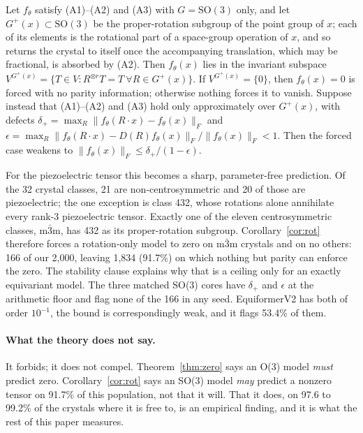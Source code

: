 \begin{corollary}\label{cor:rot}
Let $f_\theta$ satisfy (A1)--(A2) and (A3) with $G=\mathrm{SO}(3)$ only, and let $G^{+}(x)\subset\mathrm{SO}(3)$ be the proper-rotation subgroup of the point group of $x$; each of its elements is the rotational part of a space-group operation of $x$, and so returns the crystal to itself once the accompanying translation, which may be fractional, is absorbed by (A2). Then $f_\theta(x)$ lies in the invariant subspace $V^{G^{+}(x)} = \{T \in V : R^{\otimes r}T = T\ \forall R \in G^{+}(x)\}$. If $V^{G^{+}(x)} = \{0\}$, then $f_\theta(x)=0$ is forced with no parity information; otherwise nothing forces it to vanish. Suppose instead that (A1)--(A2) and (A3) hold only approximately over $G^{+}(x)$, with defects
$\delta_{+} = \max_{R} \lVert f_\theta(R\!\cdot\!x) - f_\theta(x)\rVert_F$ and
$\epsilon = \max_{R} \lVert f_\theta(R\!\cdot\!x) - D(R) f_\theta(x)\rVert_F / \lVert f_\theta(x)\rVert_F < 1$.
Then the forced case weakens to $\lVert f_\theta(x)\rVert_F \le \delta_{+}/(1-\epsilon)$.
\end{corollary}

For the piezoelectric tensor this becomes a sharp, parameter-free prediction. Of the 32 crystal classes, 21 are non-centrosymmetric and 20 of those are piezoelectric; the one exception is class 432, whose rotations alone annihilate every rank-3 piezoelectric tensor\cite{nye1985crystals}. Exactly one of the eleven centrosymmetric classes, m$\bar 3$m, has 432 as its proper-rotation subgroup. Corollary~\ref{cor:rot} therefore forces a rotation-only model to zero on m$\bar 3$m crystals and on no others: 166 of our 2,000, leaving 1,834 (91.7\%) on which nothing but parity can enforce the zero. The stability clause explains why that is a ceiling only for an exactly equivariant model. The three matched SO(3) cores have $\delta_{+}$ and $\epsilon$ at the arithmetic floor and flag none of the 166 in any seed. EquiformerV2 has both of order $10^{-1}$, the bound is correspondingly weak, and it flags 53.4\% of them.

\paragraph{What the theory does not say.} It forbids; it does not compel. Theorem~\ref{thm:zero} says an O(3) model \emph{must} predict zero. Corollary~\ref{cor:rot} says an SO(3) model \emph{may} predict a nonzero tensor on 91.7\% of this population, not that it will. That it does, on 97.6 to 99.2\% of the crystals where it is free to, is an empirical finding, and it is what the rest of this paper measures.

